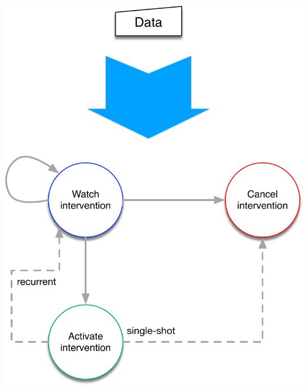 %
\begin{marginfigure}[-3.5in]
    \centering
    \includegraphics[width=\textwidth]{images/intervention_flow_chart_overview.pdf}
    \caption{%
        Intervention states and possible transitions. Based on specific events,
        the agent can start to watch a specific intervention at any moment.
        That intervention can either become active (delivered to particular
        team members) or canceled if it is no longer relevant. An active
        intervention can be watched again for possible reactivation (recurrent
        intervention), or it can be canceled if it needs to be delivered just a
        single time (single-shot intervention).
    }
    \label{fig:marker_block_intervention_flow_chart_general}
\end{marginfigure}

